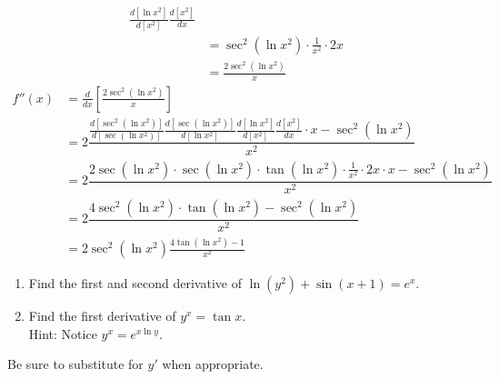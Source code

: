 \documentclass[10pt,letterpaper]{hwset}
\begin{document}
\begin{enumerate}
\begin{solution}
\begin{align*}
					\frac{d\left[ \ln x^2 \right]}{d\left[ x^2 \right]}
					\frac{d\left[ x^2 \right]}{dx} \\
				&= \sec^2 (\ln x^2)\cdot \frac{1}{x^2}\cdot 2x \\
				&= \boxed{\frac{2\sec^2 (\ln x^2)}{x}}
			\end{align*}
			\begin{align*}
				f''(x) &=\frac{d}{dx} \left[ \frac{2\sec^2 (\ln x^2)}{x} \right] \\
				&= 2\dfrac{\frac{d\left[ \sec^2(\ln x^2) \right]}{d\left[ \sec(\ln x^2)
					\right]}\frac{d\left[ \sec(\ln x^2) \right]}{d\left[ \ln x^2 \right]}
					\frac{d\left[ \ln x^2 \right]}{d\left[ x^2 \right]}
					\frac{d\left[ x^2 \right]}{dx} \cdot x - \sec^2(\ln x^2)}{x^2}\\
				&= 2\dfrac{2\sec(\ln x^2)\cdot \sec(\ln x^2)\cdot \tan(\ln x^2) \cdot
					\frac{1}{x^2}\cdot 2x \cdot x - \sec^2(\ln x^2)}{x^2}\\
				&= 2\dfrac{4\sec^2(\ln x^2)\cdot \tan(\ln x^2) - \sec^2(\ln x^2)}{x^2}\\
				&= \boxed{2\sec^2(\ln x^2)\frac{4\tan(\ln x^2) - 1}{x^2}}
				\end{align*}
		\end{solution}
\end{enumerate}

\begin{problem}[3.]
 \begin{enumerate}
	 	\item Find the first and second derivative of $\ln (y^2) + \sin (x+1) =
			e^x$.
		\item Find the first derivative of $y^x = \tan x$. \\
			Hint: Notice $y^x = e^{x \ln y}$.
 \end{enumerate}
 Be sure to substitute for $y'$ when appropriate.
\end{problem}
\end{document}
